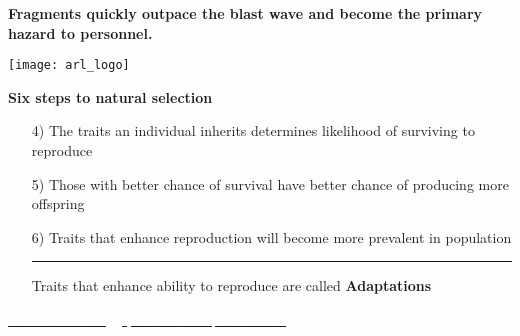 \documentclass[t]{beamer}
\begin{document}
%

%
{
\begin{frame}[t]{\bfseries Fragments quickly outpace the blast wave and become the primary hazard to personnel.}

\vfilll

\texttt{[image: arl\_logo]}

\end{frame}
}

%

\begin{frame}[t]{\LARGE \bfseries \hfill Six steps to natural selection \hfill}

\Large

\begin{enumerate}
\item[\color{black}4)] The traits an individual inherits determines likelihood of surviving to reproduce

\bigskip

\item[\color{black}5)] Those with better chance of survival have better chance of producing more offspring

\bigskip

\item[\color{black}6)] Traits that enhance reproduction will become more prevalent in population

\rule{\linewidth}{0.4pt}

\centering Traits that enhance ability to reproduce are called 
\textbf{Adaptations}

\end{enumerate}
\end{frame}

%

{
\begin{frame}
\end{frame}
}

{
\begin{frame}
\end{frame}
}

{
\begin{frame}
\tinyfill \href{https://en.m.wikipedia.org/wiki/File:Anemone_Fish_Eggs.jpg}{\textcolor{white}{Anemone Fish eggs, Silke Barron, Wikimedia, }}
\end{frame}
}
\end{document}
